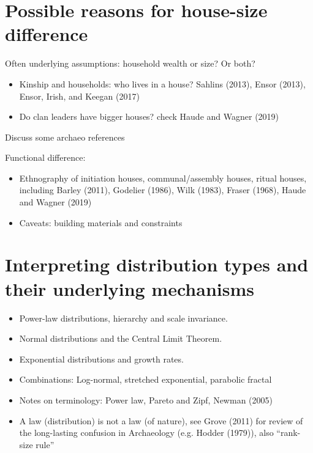 \documentclass[
  12pt,
]{book}
\begin{document}
\hypertarget{possible-reasons-for-house-size-difference}{%
\section{Possible reasons for house-size difference}\label{possible-reasons-for-house-size-difference}}

Often underlying assumptions: household wealth or size? Or both?

\begin{itemize}
\item
  Kinship and households: who lives in a house? Sahlins (2013), Ensor (2013), Ensor, Irish, and Keegan (2017)
\item
  Do clan leaders have bigger houses? check Haude and Wagner (2019)
\end{itemize}

Discuss some archaeo references

Functional difference:

\begin{itemize}
\item
  Ethnography of initiation houses, communal/assembly houses, ritual houses, including Barley (2011), Godelier (1986), Wilk (1983), Fraser (1968), Haude and Wagner (2019)
\item
  Caveats: building materials and constraints
\end{itemize}

\hypertarget{interpreting-distribution-types-and-their-underlying-mechanisms}{%
\section{Interpreting distribution types and their underlying mechanisms}\label{interpreting-distribution-types-and-their-underlying-mechanisms}}

\begin{itemize}
\item
  Power-law distributions, hierarchy and scale invariance.
\item
  Normal distributions and the Central Limit Theorem.
\item
  Exponential distributions and growth rates.
\item
  Combinations: Log-normal, stretched exponential, parabolic fractal
\item
  Notes on terminology: Power law, Pareto and Zipf, Newman (2005)
\item
  A law (distribution) is not a law (of nature), see Grove (2011) for review of the long-lasting confusion in Archaeology (e.g. Hodder (1979)), also ``rank-size rule''
\end{itemize}
\end{document}
